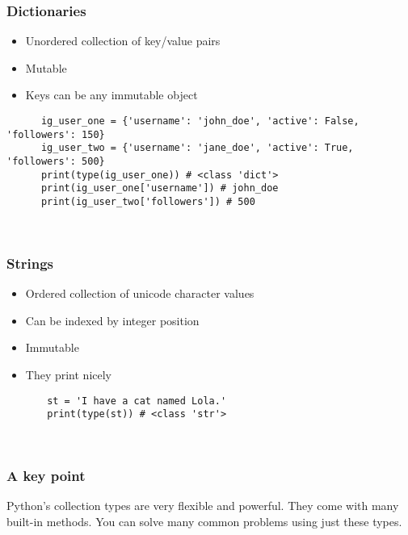 \documentclass[10pt]{beamer}
\begin{document}
\begin{frame}[fragile]
  \frametitle{Dictionaries}
   
   
   \begin{itemize}
     \item Unordered collection of key/value pairs
     \item Mutable
     \item Keys can be any immutable object
   
   \end{itemize} 
   

  
   \begin{verbatim}
      ig_user_one = {'username': 'john_doe', 'active': False, 'followers': 150}
      ig_user_two = {'username': 'jane_doe', 'active': True, 'followers': 500}
      print(type(ig_user_one)) # <class 'dict'>
      print(ig_user_one['username']) # john_doe
      print(ig_user_two['followers']) # 500
   
   
   \end{verbatim}
  
  
\end{frame}

\begin{frame}[fragile]
  \frametitle{Strings}
   
   \begin{itemize}
     \item Ordered collection of unicode character values
     \item Can be indexed by integer position
     \item Immutable
     \item They print nicely
   
   \end{itemize}     
   

  
   \begin{verbatim}
       st = 'I have a cat named Lola.'
       print(type(st)) # <class 'str'>
   
   
   \end{verbatim}
  
  
\end{frame}

\begin{frame}[fragile]
  \frametitle{A key point}
   
   Python's collection types are very flexible and powerful. They come 
   with many built-in methods. You can solve many common problems using 
   just these types.
     
\end{frame}
\end{document}
